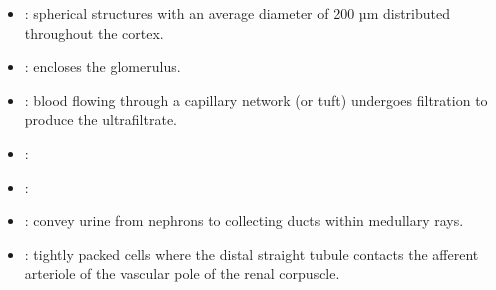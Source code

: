 \begin{multicols}{2}
\begin{itemize}
  \item {}: spherical structures with an average diameter of 200 µm distributed throughout the cortex. 
  
  \begin{center}
  \end{center}
  
  \item {}: encloses the glomerulus.
  
  \begin{center}
  \end{center}
  
  \item {}:  blood flowing through a capillary network (or tuft) undergoes filtration to produce the ultrafiltrate. 
  
  \begin{center}
  \end{center}
  
  \item {}:
  
  \begin{center}
  \end{center}
  
  \item {}:
  
  \begin{center}
  \end{center}
  
  \item {}: convey urine from nephrons to collecting ducts within medullary rays.
  
  \begin{center}
  \end{center}
  
  \item {}: tightly packed cells where the distal straight tubule contacts the afferent arteriole of the vascular pole of the renal corpuscle.
  
  \begin{center}
  \end{center}

\end{itemize}
\end{multicols}


